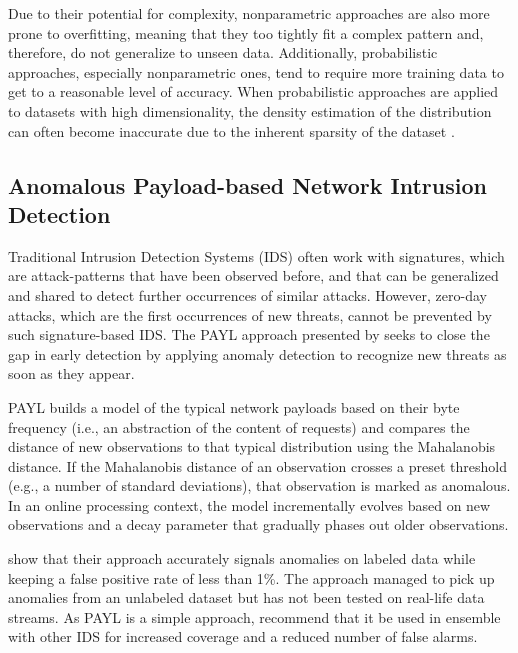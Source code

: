 
\clearpage
\restoregeometry

Due to their potential for complexity, nonparametric approaches are also more prone to overfitting, meaning that they too tightly fit a complex pattern and, therefore, do not generalize to unseen data. Additionally, probabilistic approaches, especially nonparametric ones, tend to require more training data to get to a reasonable level of accuracy. When probabilistic approaches are applied to datasets with high dimensionality, the density estimation of the distribution can often become inaccurate due to the inherent sparsity of the dataset \citep{pimentel_review_2014, kontaki_continuous_2011}.


\subsection{Anomalous Payload-based Network Intrusion Detection \citep{hutchison_anomalous_2004}}
Traditional Intrusion Detection Systems (IDS) often work with signatures, which are attack-patterns that have been observed before, and that can be generalized and shared to detect further occurrences of similar attacks. However, zero-day attacks, which are the first occurrences of new threats, cannot be prevented by such signature-based IDS. The PAYL approach presented by \citet{hutchison_anomalous_2004} seeks to close the gap in early detection by applying anomaly detection to recognize new threats as soon as they appear.

PAYL builds a model of the typical network payloads based on their byte frequency (i.e., an abstraction of the content of requests) and compares the distance of new observations to that typical distribution using the Mahalanobis distance. If the Mahalanobis distance of an observation crosses a preset threshold (e.g., a number of standard deviations), that observation is marked as anomalous. In an online processing context, the model incrementally evolves based on new observations and a decay parameter that gradually phases out older observations.

\citet{hutchison_anomalous_2004} show that their approach accurately signals anomalies on labeled data while keeping a false positive rate of less than 1\%. The approach managed to pick up anomalies from an unlabeled dataset but has not been tested on real-life data streams. As PAYL is a simple approach, \citet{hutchison_anomalous_2004} recommend that it be used in ensemble with other IDS for increased coverage and a reduced number of false alarms.


